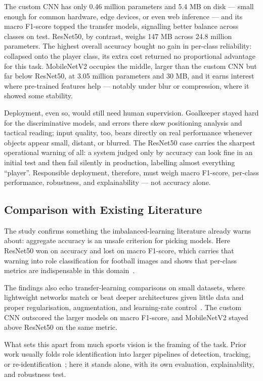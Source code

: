 \documentclass[preprint,12pt]{elsarticle}
\begin{document}
The custom CNN has only 0.46 million parameters and 5.4 MB on disk --- small enough for common hardware, edge devices, or even web inference --- and its macro F1-score topped the transfer models, signalling better balance across classes on test. ResNet50, by contrast, weighs 147 MB across 24.8 million parameters. The highest overall accuracy bought no gain in per-class reliability: collapsed onto the player class, its extra cost returned no proportional advantage for this task. MobileNetV2 occupies the middle, larger than the custom CNN but far below ResNet50, at 3.05 million parameters and 30 MB, and it earns interest where pre-trained features help --- notably under blur or compression, where it showed some stability.

Deployment, even so, would still need human supervision. Goalkeeper stayed hard for the discriminative models, and errors there skew positioning analysis and tactical reading; input quality, too, bears directly on real performance whenever objects appear small, distant, or blurred. The ResNet50 case carries the sharpest operational warning of all: a system judged only by accuracy can look fine in an initial test and then fail silently in production, labelling almost everything ``player''. Responsible deployment, therefore, must weigh macro F1-score, per-class performance, robustness, and explainability --- not accuracy alone.

\subsection{Comparison with Existing Literature}

The study confirms something the imbalanced-learning literature already warns about: aggregate accuracy is an unsafe criterion for picking models. Here ResNet50 won on accuracy and lost on macro F1-score, which carries that warning into role classification for football images and shows that per-class metrics are indispensable in this domain~\cite{ghosh2024imbalance}.

The findings also echo transfer-learning comparisons on small datasets, where lightweight networks match or beat deeper architectures given little data and proper regularisation, augmentation, and learning-rate control~\cite{martins2025mobilenet}. The custom CNN outscored the larger models on macro F1-score, and MobileNetV2 stayed above ResNet50 on the same metric.

What sets this apart from much sports vision is the framing of the task. Prior work usually folds role identification into larger pipelines of detection, tracking, or re-identification~\cite{giancola2018soccernet,somers2024multitask}; here it stands alone, with its own evaluation, explainability, and robustness test.
\end{document}
